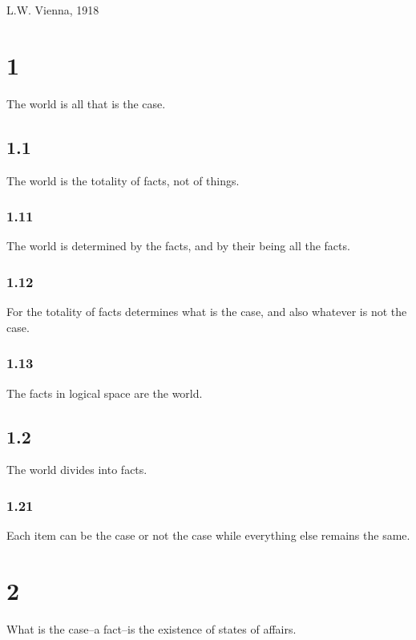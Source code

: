 \documentclass[11pt]{article}
\begin{document}
L.W. Vienna, 1918

\section*{1}
\label{sec:org4901420}
The world is all that is the case.
\subsection*{1.1}
\label{sec:orgc31d3eb}
The world is the totality of facts, not of things.
\subsubsection*{1.11}
\label{sec:org905d8c4}
The world is determined by the facts, and by their being all the
facts.
\subsubsection*{1.12}
\label{sec:org1837cba}
For the totality of facts determines what is the case, and also
whatever is not the case.
\subsubsection*{1.13}
\label{sec:orgc4ec194}
The facts in logical space are the world.
\subsection*{1.2}
\label{sec:org320e903}
The world divides into facts.
\subsubsection*{1.21}
\label{sec:org2f3ccd4}
Each item can be the case or not the case while everything else
remains the same.
\section*{2}
\label{sec:org3453611}
What is the case--a fact--is the existence of states of affairs.
\end{document}
